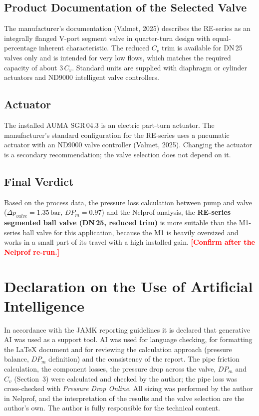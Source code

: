 \documentclass[11pt,a4paper]{article}
\newcommand{\nel}[1]{\textcolor{red}{\textbf{[#1]}}}
\begin{document}
\subsection{Product Documentation of the Selected Valve}
The manufacturer's documentation (Valmet, 2025) describes the RE-series as an integrally flanged V-port segment valve in quarter-turn design with equal-percentage inherent characteristic. The reduced $C_v$ trim is available for DN\,25 valves only and is intended for very low flows, which matches the required capacity of about $3\,C_v$. Standard units are supplied with diaphragm or cylinder actuators and ND9000 intelligent valve controllers.

\subsection{Actuator}
The installed AUMA SGR\,04.3 is an electric part-turn actuator. The manufacturer's standard configuration for the RE-series uses a pneumatic actuator with an ND9000 valve controller (Valmet, 2025). Changing the actuator is a secondary recommendation; the valve selection does not depend on it.

\subsection{Final Verdict}
Based on the process data, the pressure loss calculation between pump and valve ($\Delta p_{valve} = 1.35\,\text{bar}$, $DP_m = 0.97$) and the Nelprof analysis, the \textbf{RE-series segmented ball valve (DN\,25, reduced trim)} is more suitable than the M1-series ball valve for this application, because the M1 is heavily oversized and works in a small part of its travel with a high installed gain. \nel{Confirm after the Nelprof re-run.}

\section*{Declaration on the Use of Artificial Intelligence}
In accordance with the JAMK reporting guidelines it is declared that generative AI was used as a support tool. AI was used for language checking, for formatting the LaTeX document and for reviewing the calculation approach (pressure balance, $DP_m$ definition) and the consistency of the report. The pipe friction calculation, the component losses, the pressure drop across the valve, $DP_m$ and $C_v$ (Section~3) were calculated and checked by the author; the pipe loss was cross-checked with \textit{Pressure Drop Online}. All sizing was performed by the author in Nelprof, and the interpretation of the results and the valve selection are the author's own. The author is fully responsible for the technical content.
\end{document}
